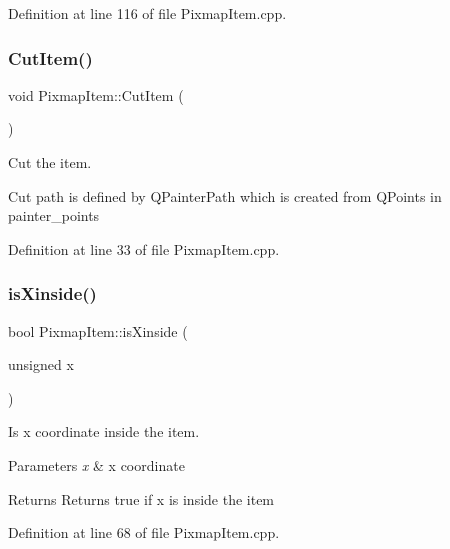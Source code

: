 Definition at line 116 of file Pixmap\+Item.\+cpp.

\mbox{\label{classPixmapItem_a4a742318dce01d018da2f4b01790c210}} 
\subsubsection{\texorpdfstring{Cut\+Item()}{CutItem()}}
{\footnotesize\ttfamily void Pixmap\+Item\+::\+Cut\+Item (\begin{DoxyParamCaption}{ }\end{DoxyParamCaption})}



Cut the item. 

Cut path is defined by Q\+Painter\+Path which is created from Q\+Points in painter\+\_\+points 

Definition at line 33 of file Pixmap\+Item.\+cpp.

\mbox{\label{classPixmapItem_ad5510bf5a97b352e3b06cb888ac0a99c}} 
\subsubsection{\texorpdfstring{is\+Xinside()}{isXinside()}}
{\footnotesize\ttfamily bool Pixmap\+Item\+::is\+Xinside (\begin{DoxyParamCaption}\item[{unsigned}]{x }\end{DoxyParamCaption})}



Is x coordinate inside the item. 


\begin{DoxyParams}{Parameters}
{\em x} & x coordinate \\
\hline
\end{DoxyParams}
\begin{DoxyReturn}{Returns}
Returns true if x is inside the item 
\end{DoxyReturn}


Definition at line 68 of file Pixmap\+Item.\+cpp.

\mbox{\label{classPixmapItem_ab6e6526fd5cd0ce5ba34b665adca6c5c}} 
